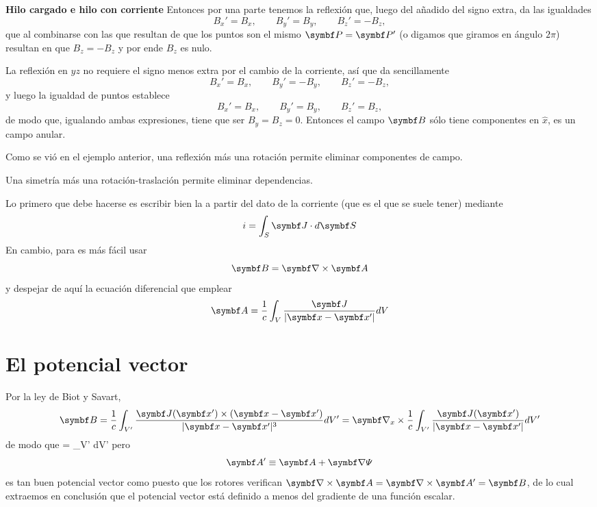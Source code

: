 \documentclass[10pt,oneside]{CBFT_book}
\begin{document}
\begin{ejemplo}{\bf Hilo cargado e hilo con corriente}
Entonces por una parte tenemos la reflexión que, luego del añadido del signo extra, da las igualdades 
\[
	B_x' = B_x, \qquad B_y' = B_y, \qquad B_z' = -B_z,
\]
que al combinarse con las que resultan de que los puntos son el mismo $\vb{P}=\vb{P}'$ (o digamos que 
giramos en ángulo $2\pi$) resultan en que $B_z = -B_z$ y por ende $B_z$ es nulo.

La reflexión en $yz$ no requiere el signo menos extra por el cambio de la corriente, así que da sencillamente 
\[
	B_x' = B_x, \qquad B_y' = -B_y, \qquad B_z' = -B_z,
\]
y luego la igualdad de puntos establece 
\[
	B_x' = B_x, \qquad B_y' = B_y, \qquad B_z' = B_z,
\]
de modo que, igualando ambas expresiones, tiene que ser $ B_y = B_z = 0 $. Entonces el campo $\vb{B}$ sólo
tiene componentes en $\hat{x}$, es un campo anular.
\end{ejemplo}



Como se vió en el ejemplo anterior, una reflexión más una rotación permite eliminar componentes 
de campo.


Una simetría más una rotación-traslación permite eliminar dependencias.

Lo primero que debe hacerse es escribir bien la  a partir del dato de la corriente
(que es el que se suele tener) mediante
\[
	i = \int_S \vb{J} \cdot d \vb{S}
\]
En cambio, para  es más fácil usar
\[
	\vb{B} = \rotorm{A}
\]
y despejar de aquí la ecuación diferencial que emplear
\[
	\vb{A} = \frac{1}{c} \int_V \frac{\vb{J}}{|\vb{x}-\vb{x}'|} dV
\]


\section{El potencial vector}

Por la ley de Biot y Savart,
\[
	\vb{B} = \frac{1}{c} \int_{V'} \frac{\vb{J}(\vb{x}') \times (\vb{x}-\vb{x}')}{|\vb{x}-\vb{x}'|^3} 
	dV' = \Nabla_x \times \frac{1}{c} \int_{V'} \frac{\vb{J}(\vb{x}')}{|\vb{x}-\vb{x}'|} dV'
\]
de modo que
\be
	 =  \int_{V'}  dV'
	\label{potvec}
\ee
pero 
\[
	\vb{A}' \equiv \vb{A} + \Nabla \Psi
\]
es tan buen potencial vector como  puesto que los rotores verifican $\rotorm{A}=\rotorm{A}'=\vb{B}$,
de lo cual extraemos en conclusión que el potencial vector está definido a menos del gradiente de una
función escalar.
\end{document}

